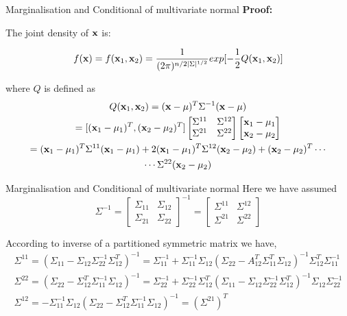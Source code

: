 \documentclass{beamer}
\begin{document}
\begin{frame}{Marginalisation and Conditional of multivariate normal}
	\textbf{Proof:}
	
	The joint density of ${\bf x}$ is:
	
	\begin{equation}
	f({\bf x})=f({\bf x}_1,{\bf x}_2)=\frac{1}{(2\pi)^{n/2\vert\Sigma\vert^{1/2}}}exp[-\frac{1}{2}Q({\bf x}_1,{\bf x}_2)] 
	\end{equation}
	
	where $Q$ is defined as
	\begin{gather}
		Q({\bf x}_1,{\bf x}_2) = ({\bf x}-\mu)^T\Sigma^{-1}({\bf x}-\mu)\\
		= [({\bf x}_1-\mu_1)^T, ({\bf x}_2-\mu_2)^T] 
		\begin{bmatrix}
			\Sigma^{11} & \Sigma^{12}\\
			\Sigma^{21} & \Sigma^{22}
		\end{bmatrix}
		\begin{bmatrix}
			{\bf x}_1-\mu_1 \\
			{\bf x}_2-\mu_2
		\end{bmatrix}\\
		= ({\bf x}_1-\mu_1)^T\Sigma^{11}({\bf x}_1-\mu_1)+ 2({\bf x}_1-\mu_1)^T\Sigma^{12}({\bf x}_2-\mu_2) + ({\bf x}_2-\mu_2)^T \cdots \\
		\cdots \Sigma^{22}({\bf x}_2-\mu_2)
	\end{gather}
\end{frame}

\begin{frame}{Marginalisation and Conditional of multivariate normal}
	Here we have assumed 
$$	
	\Sigma^{-1}=\left[\begin{array}{cc}
		{\Sigma_{11}} & {\Sigma_{12}} \\
		{\Sigma_{21}} & {\Sigma_{22}}
	\end{array}\right]^{-1}=\left[\begin{array}{cc}
		{\Sigma^{11}} & {\Sigma^{12}} \\
		{\Sigma^{21}} & {\Sigma^{22}}
	\end{array}\right]
$$

	According to inverse of a partitioned symmetric matrix we have, 
	\begin{gather}
		\Sigma^{11}=\left(\Sigma_{11}-\Sigma_{12} \Sigma_{22}^{-1} \Sigma_{12}^{T}\right)^{-1}=\Sigma_{11}^{-1}+\Sigma_{11}^{-1} \Sigma_{12}\left(\Sigma_{22}-A_{12}^{T} \Sigma_{11}^{T} \Sigma_{12}\right)^{-1} \Sigma_{12}^{T} \Sigma_{11}^{-1}\\
		\Sigma^{22}=\left(\Sigma_{22}-\Sigma_{12}^{T} \Sigma_{11}^{-1} \Sigma_{12}\right)^{-1}=\Sigma_{22}^{-1}+\Sigma_{22}^{-1} \Sigma_{12}^{T}\left(\Sigma_{11}-\Sigma_{12} \Sigma_{22}^{-1} \Sigma_{12}^{T}\right)^{-1} \Sigma_{12} \Sigma_{22}^{-1}\\
		\Sigma^{12}=-\Sigma_{11}^{-1} \Sigma_{12}\left(\Sigma_{22}-\Sigma_{12}^{T} \Sigma_{11}^{-1} \Sigma_{12}\right)^{-1}=\left(\Sigma^{21}\right)^{T}
	\end{gather}

\end{frame}
\end{document}
